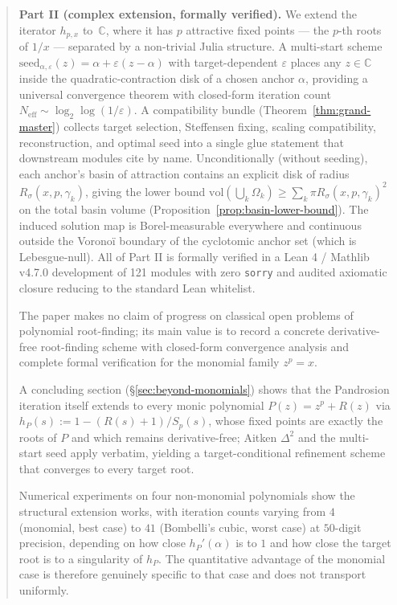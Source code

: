 \documentclass[11pt,a4paper]{article}
\theoremstyle{definition}
\begin{document}
\begin{abstract}
\textbf{Part II (complex extension, formally verified).} We extend the
iterator $h_{p,x}$ to~$\mathbb{C}$, where it has $p$ attractive fixed
points --- the $p$-th roots of $1/x$ --- separated by a non-trivial
Julia structure. A multi-start scheme
$\mathrm{seed}_{\alpha,\varepsilon}(z) = \alpha + \varepsilon(z-\alpha)$
with target-dependent $\varepsilon$ places any $z \in \mathbb{C}$
inside the quadratic-contraction disk of a chosen anchor $\alpha$,
providing a universal convergence theorem with closed-form iteration
count $N_{\mathrm{eff}} \sim \log_2 \log(1/\varepsilon)$. A
compatibility bundle (Theorem~\ref{thm:grand-master}) collects target
selection, Steffensen fixing, scaling compatibility, reconstruction, and
optimal seed into a single glue statement that downstream modules cite
by name.
Unconditionally (without seeding), each anchor's basin of attraction
contains an explicit disk of radius $R_\sigma(x, p, \gamma_k)$, giving
the lower bound $\mathrm{vol}(\bigcup_k \Omega_k) \geq \sum_k \pi R_\sigma(x, p, \gamma_k)^2$
on the total basin volume (Proposition~\ref{prop:basin-lower-bound}). The
induced solution map is Borel-measurable everywhere and continuous
outside the Voronoï boundary of the cyclotomic anchor set (which is
Lebesgue-null). All of Part II is formally verified in a Lean 4 /
Mathlib v4.7.0 development of 121 modules with zero \texttt{sorry}
and audited axiomatic closure reducing to the standard Lean whitelist.

\medskip

The paper makes no claim of progress on classical open problems of
polynomial root-finding; its main value is to record a concrete
derivative-free root-finding scheme with closed-form convergence
analysis and complete formal verification for the monomial family
$z^p = x$.

A concluding section (\S\ref{sec:beyond-monomials})
shows that the Pandrosion iteration itself extends to every monic
polynomial $P(z) = z^p + R(z)$ via
$h_P(s) := 1 - (R(s) + 1)/S_p(s)$, whose fixed points are exactly
the roots of $P$ and which remains derivative-free; Aitken $\Delta^2$
and the multi-start seed apply verbatim, yielding a target-conditional
refinement scheme that converges to every target root.

Numerical
experiments on four non-monomial polynomials show the structural
extension works, with iteration counts varying from $4$ (monomial,
best case) to $41$ (Bombelli's cubic, worst case) at $50$-digit
precision, depending on how close $h_P'(\alpha)$ is to $1$ and how
close the target root is to a singularity of $h_P$. The quantitative
advantage of the monomial case is therefore genuinely specific to
that case and does not transport uniformly.
\end{abstract}
\end{document}
